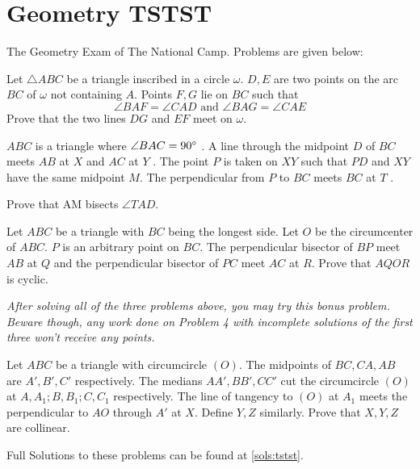 
\chapter{Geometry TSTST}\label{tstst:geo}
The Geometry Exam of The National Camp.
Problems are given below:

\begin{prob}\label{geo:1}
Let $\triangle ABC$ be a triangle inscribed in a circle $\omega$. $D, E$ are two points on the arc $BC$
of $\omega$ not containing $A$. Points $F, G$ lie on $BC$ such that
\[\angle BAF =\angle CAD %
\text{ and } \angle BAG=\angle CAE\]
Prove that the two lines $DG$ and $EF$ meet on $\omega$.
\end{prob}

\begin{prob}\label{geo:2}
$ABC$ is a triangle where $\angle BAC = 90^\circ$ . A line through the midpoint $D$ of $BC$ meets
$AB$ at $X$ and $AC$ at $Y$ . The point $P$ is taken on $XY$ such that $PD$ and $XY$ have the same midpoint
$M$. The perpendicular from $P$ to $BC$ meets $BC$ at $T$ .

Prove that AM bisects $\angle TAD$.
\end{prob}

\begin{prob}\label{geo:3}
Let $ABC$ be a triangle with $BC$ being the longest side. Let $O$ be the circumcenter
of $ABC$. $P$ is an arbitrary point on $BC$. The perpendicular bisector of $BP$ meet $AB$ at $Q$ and the
perpendicular bisector of $PC$ meet $AC$ at $R$. Prove that $AQOR$ is cyclic.
\end{prob}

\textit{After solving all of the three problems above, you may try this bonus problem. Beware though,
any work done on Problem 4 with incomplete solutions of the first three won’t receive any
points.}

\begin{prob}\label{geo:4}
Let $ABC$ be a triangle with circumcircle $(O)$. The midpoints of $BC,CA, AB$ are
$A', B', C'$ respectively. The medians $AA', BB' ,CC'$ cut the circumcircle $(O)$ at $A, A_1 ; B, B_1 ; C,C_1$
respectively. The line of tangency to $(O)$ at $A_1$ meets the perpendicular to $AO$ through $A ′$ at $X$.
Define $Y, Z$ similarly. Prove that $X,Y, Z$ are collinear.
\end{prob}



Full Solutions to these problems can be found at \autoref{sols:tstst}.